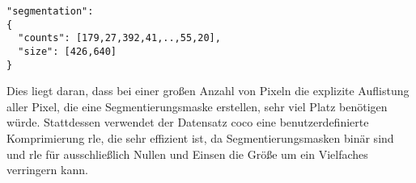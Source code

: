 \begin{description}
  \begin{lstlisting}
"segmentation":
{
  "counts": [179,27,392,41,..,55,20],
  "size": [426,640]
}
  \end{lstlisting}

  \bigskip

  Dies liegt daran, dass bei einer großen Anzahl von Pixeln die explizite Auflistung aller Pixel, die eine Segmentierungsmaske erstellen, sehr viel Platz benötigen würde. Stattdessen verwendet der Datensatz \ac{coco} eine benutzerdefinierte Komprimierung \ac{rle}, die sehr effizient ist, da Segmentierungsmasken binär sind und \ac{rle} für ausschließlich Nullen und Einsen die Größe um ein Vielfaches verringern kann.

\end{description}

